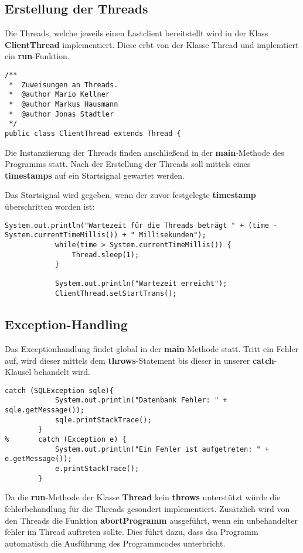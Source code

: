 \subsection{Erstellung der Threads}

Die Threads, welche jeweils einen Lastclient bereitstellt wird in der Klass
\textbf{ClientThread} implementiert. Diese erbt von der Klasse Thread und
implemtiert ein \textbf{run}-Funktion.

\begin{lstlisting}[caption={Ausschnitt aus ClientThread}]
/**
 *  Zuweisungen an Threads.
 *  @author Mario Kellner
 *	@author Markus Hausmann
 *  @author Jonas Stadtler
 */
public class ClientThread extends Thread {
\end{lstlisting}

Die Instanziierung der Threads finden anschließend in der
\textbf{main}-Methode des Programms statt. Nach der Erstellung der Threads
soll mittels eines \textbf{timestamps} auf ein Startsignal gewartet werden.


Das Startsignal wird gegeben, wenn der zuvor festgelegte \textbf{timestamp}
überschritten worden ist:

\begin{lstlisting}[caption={Wartezeit}]
		    System.out.println("Wartezeit für die Threads beträgt " + (time - System.currentTimeMillis()) + " Millisekunden");
		    while(time > System.currentTimeMillis()) {
		    	Thread.sleep(1);
		    }
		    
		    System.out.println("Wartezeit erreicht");
		    ClientThread.setStartTrans();
\end{lstlisting}


\subsection{Exception-Handling}

Das Exceptionhandlung findet global in der \textbf{main}-Methode statt. Tritt
ein Fehler auf, wird dieser mittels dem \textbf{throws}-Statement
 bis dieser in unserer \textbf{catch}-Klausel behandelt wird.

\begin{lstlisting}[caption={Catch-Block}]
		catch (SQLException sqle){
			System.out.println("Datenbank Fehler: " + sqle.getMessage());
			sqle.printStackTrace();
		}
% 		catch (Exception e) {
			System.out.println("Ein Fehler ist aufgetreten: " + e.getMessage());
			e.printStackTrace();
		}
\end{lstlisting}

Da die \textbf{run}-Methode der Klasse \textbf{Thread} kein \textbf{throws}
unterstützt würde die fehlerbehandlung für die Threads gesondert implementiert.
Zusätzlich wird von den Threads die Funktion \textbf{abortProgramm}
ausgeführt, wenn ein unbehandelter fehler im Thread auftreten sollte. Dies führt
dazu, dass dsa Programm automatisch die Ausführung des Programmcodes
unterbricht.

\clearpage